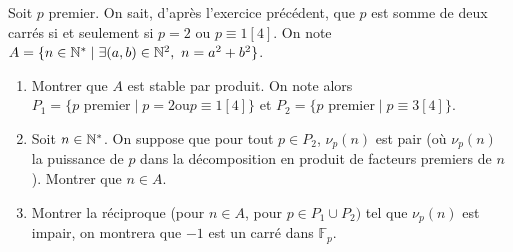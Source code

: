 \begin{exercise}[Fermat]
	Soit $p$ premier. On sait, d'après l'exercice précédent, que $p$ est somme de
	deux carrés si et seulement si $p=2$ ou $p\equiv 1[4]$. On note
	$A=\{n\in\mathbb{N}^{*}\mid\exists(a,b)\in\mathbb{N}^{2},~n=a^{2}+b^{2}\}$.
	\begin{enumerate}
		\item
		Montrer que $A$ est stable par produit. On note alors $P_{1}=\{p
		\text{ premier}\mid p=2\text{ou}p\equiv 1[4]\}$ et
		$P_{2}=\{p\text{ premier}\mid p\equiv3[4]\}$.
		\item
		Soit $n\in\mathbb{N}^{*}$. On suppose que pour tout $p\in P_{2}$, $\nu_{p}(n)$ est
		pair (où $\nu_{p}(n)$ la puissance de $p$ dans la décomposition en produit
		de facteurs premiers de $n$). Montrer que $n\in A$.
		\item
		Montrer la réciproque (pour $n\in A$, pour $p\in P_{1}\cup P_{2})$ tel que
		$\nu_{p}(n)$ est impair, on montrera que $-1$ est un carré dans
		$\mathbb{F}_{p}$.
	\end{enumerate}
\end{exercise}